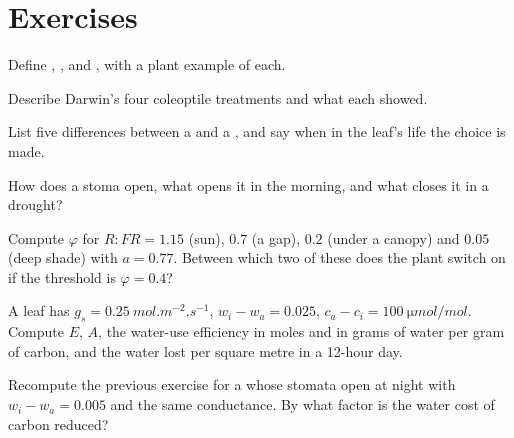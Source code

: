 \section{Exercises}

\begin{exercise}[$\star$]\label{exo:b2:plant-plasticity:1}
Define , ,  and
, with a plant example of each.
\end{exercise}

\begin{exercise}[$\star$]\label{exo:b2:plant-plasticity:2}
Describe Darwin's four coleoptile treatments and what each showed.
\end{exercise}

\begin{exercise}[$\star$]\label{exo:b2:plant-plasticity:3}
List five differences between a  and a , and say
when in the leaf's life the choice is made.
\end{exercise}

\begin{exercise}[$\star$]\label{exo:b2:plant-plasticity:4}
How does a stoma open, what opens it in the morning, and what closes
it in a drought?
\end{exercise}

\begin{exercise}[$\star\star$]\label{exo:b2:plant-plasticity:5}
Compute $\varphi$ for $R{:}FR = 1.15$ (sun), $0.7$ (a gap), $0.2$
(under a canopy) and $0.05$ (deep shade) with $a = 0.77$. Between
which two of these does the plant switch on  if the
threshold is $\varphi = 0.4$?
\end{exercise}

\begin{exercise}[$\star\star$]\label{exo:b2:plant-plasticity:6}
A leaf has $g_s = \qty{0.25}{mol.m^{-2}.s^{-1}}$, $w_i - w_a = 0.025$,
$c_a - c_i = \qty{100}{\micro mol/mol}$. Compute $E$, $A$, the
water-use efficiency in moles and in grams of water per gram of
carbon, and the water lost per square metre in a 12-hour day.
\end{exercise}

\begin{exercise}[$\star\star$]\label{exo:b2:plant-plasticity:7}
Recompute the previous exercise for a  whose stomata open
at night with $w_i - w_a = 0.005$ and the same conductance. By what
factor is the water cost of carbon reduced?
\end{exercise}

